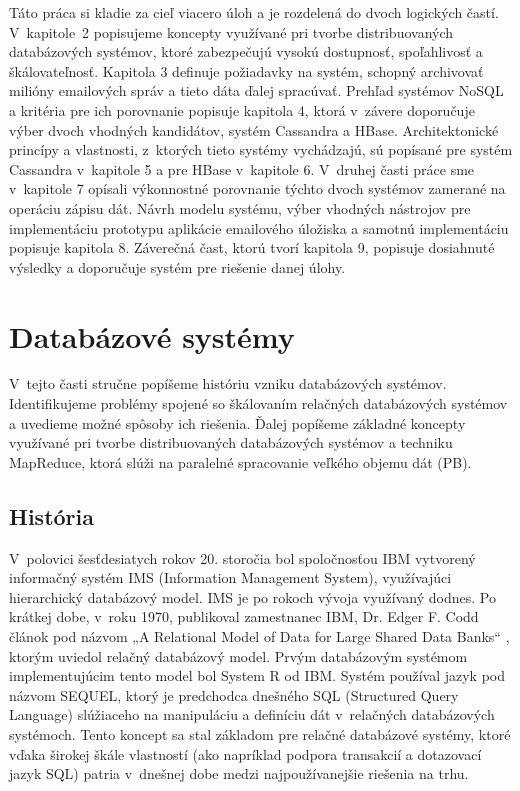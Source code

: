\documentclass[11pt,twoside,a4paper]{book}
\begin{document}
Táto práca si kladie za cieľ viacero úloh a je rozdelená do dvoch logických častí. V~kapitole~2 popisujeme koncepty využívané pri tvorbe distribuovaných databázových systémov, ktoré zabezpečujú vysokú dostupnosť, spoľahlivosť a škálovateľnosť. Kapitola 3 definuje požiadavky na systém, schopný archivovať milióny emailových správ a tieto dáta ďalej spracúvať. Prehľad systémov NoSQL a kritéria pre ich porovnanie popisuje kapitola 4, ktorá v~závere doporučuje výber dvoch vhodných kandidátov, systém Cassandra a HBase. Architektonické princípy a vlastnosti, z~ktorých tieto systémy vychádzajú, sú popísané pre systém Cassandra v~kapitole 5 a pre HBase v~kapitole 6.
V~druhej časti práce sme v~kapitole 7 opísali výkonnostné porovnanie týchto dvoch systémov zamerané na operáciu zápisu dát. Návrh modelu systému, výber vhodných nástrojov pre implementáciu prototypu aplikácie emailového úložiska a samotnú implementáciu popisuje kapitola 8. 
Záverečná čast, ktorú tvorí kapitola 9, popisuje dosiahnuté výsledky a doporučuje systém pre riešenie danej úlohy.







\chapter{Databázové systémy}

V~tejto časti stručne popíšeme históriu vzniku databázových systémov. Identifikujeme problémy spojené so škálovaním relačných databázových systémov a uvedieme možné spôsoby ich riešenia. Ďalej popíšeme základné koncepty využívané pri tvorbe distribuovaných databázových systémov a techniku MapReduce, ktorá slúži na paralelné spracovanie veľkého objemu dát (PB).

\section{História}

V~polovici šesťdesiatych rokov 20. storočia bol spoločnosťou IBM vytvorený informačný systém IMS (Information Management System), využívajúci hierarchický databázový model. IMS je po rokoch vývoja využívaný dodnes. Po krátkej dobe, v~roku 1970, publikoval zamestnanec IBM, Dr. Edger F. Codd článok pod názvom „A Relational Model of Data for Large Shared Data Banks“ \cite{Codd:1970:RMD:362384.362685}, ktorým uviedol relačný databázový model. Prvým databázovým systémom implementujúcim tento model bol System R od IBM. Systém používal jazyk pod názvom SEQUEL, ktorý je predchodca dnešného SQL (Structured Query Language) slúžiaceho na manipuláciu a definíciu dát v~relačných databázových systémoch. Tento koncept sa stal základom pre relačné databázové systémy, ktoré vďaka širokej škále vlastností (ako napríklad podpora transakcií a dotazovací jazyk SQL) patria v~dnešnej  dobe medzi najpoužívanejšie riešenia na trhu.
\end{document}
